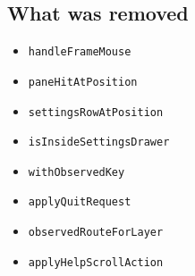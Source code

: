 \subsection{What was removed}\label{record-276-what-was-removed}

\begin{itemize}
\tightlist
\item
  \texttt{h\allowbreak{}a\allowbreak{}n\allowbreak{}d\allowbreak{}l\allowbreak{}e\allowbreak{}F\allowbreak{}r\allowbreak{}a\allowbreak{}m\allowbreak{}e\allowbreak{}M\allowbreak{}o\allowbreak{}u\allowbreak{}s\allowbreak{}e}
\item
  \texttt{p\allowbreak{}a\allowbreak{}n\allowbreak{}e\allowbreak{}H\allowbreak{}i\allowbreak{}t\allowbreak{}A\allowbreak{}t\allowbreak{}P\allowbreak{}o\allowbreak{}s\allowbreak{}i\allowbreak{}t\allowbreak{}i\allowbreak{}o\allowbreak{}n}
\item
  \texttt{s\allowbreak{}e\allowbreak{}t\allowbreak{}t\allowbreak{}i\allowbreak{}n\allowbreak{}g\allowbreak{}s\allowbreak{}R\allowbreak{}o\allowbreak{}w\allowbreak{}A\allowbreak{}t\allowbreak{}P\allowbreak{}o\allowbreak{}s\allowbreak{}i\allowbreak{}t\allowbreak{}i\allowbreak{}o\allowbreak{}n}
\item
  \texttt{i\allowbreak{}s\allowbreak{}I\allowbreak{}n\allowbreak{}s\allowbreak{}i\allowbreak{}d\allowbreak{}e\allowbreak{}S\allowbreak{}e\allowbreak{}t\allowbreak{}t\allowbreak{}i\allowbreak{}n\allowbreak{}g\allowbreak{}s\allowbreak{}D\allowbreak{}r\allowbreak{}a\allowbreak{}w\allowbreak{}e\allowbreak{}r}
\item
  \texttt{w\allowbreak{}i\allowbreak{}t\allowbreak{}h\allowbreak{}O\allowbreak{}b\allowbreak{}s\allowbreak{}e\allowbreak{}r\allowbreak{}v\allowbreak{}e\allowbreak{}d\allowbreak{}K\allowbreak{}e\allowbreak{}y}
\item
  \texttt{a\allowbreak{}p\allowbreak{}p\allowbreak{}l\allowbreak{}y\allowbreak{}Q\allowbreak{}u\allowbreak{}i\allowbreak{}t\allowbreak{}R\allowbreak{}e\allowbreak{}q\allowbreak{}u\allowbreak{}e\allowbreak{}s\allowbreak{}t}
\item
  \texttt{o\allowbreak{}b\allowbreak{}s\allowbreak{}e\allowbreak{}r\allowbreak{}v\allowbreak{}e\allowbreak{}d\allowbreak{}R\allowbreak{}o\allowbreak{}u\allowbreak{}t\allowbreak{}e\allowbreak{}F\allowbreak{}o\allowbreak{}r\allowbreak{}L\allowbreak{}a\allowbreak{}y\allowbreak{}e\allowbreak{}r}
\item
  \texttt{a\allowbreak{}p\allowbreak{}p\allowbreak{}l\allowbreak{}y\allowbreak{}H\allowbreak{}e\allowbreak{}l\allowbreak{}p\allowbreak{}S\allowbreak{}c\allowbreak{}r\allowbreak{}o\allowbreak{}l\allowbreak{}l\allowbreak{}A\allowbreak{}c\allowbreak{}t\allowbreak{}i\allowbreak{}o\allowbreak{}n}
\end{itemize}

